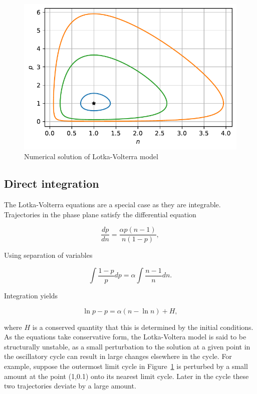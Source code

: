 \documentclass[
  letterpaper,
  DIV=11,
  numbers=noendperiod]{scrreprt}
\begin{document}
\begin{figure}

{\centering \includegraphics{ContinuousTimeTwoSepcies_files/figure-pdf/fig-lv-numsol-phplane-output-1.pdf}

}

\caption{\label{fig-lv-numsol-phplane}Numerical solution of
Lotka-Volterra model}

\end{figure}

\hypertarget{direct-integration}{%
\subsection{Direct integration}\label{direct-integration}}

The Lotka-Volterra equations are a special case as they are integrable.
Trajectories in the phase plane satisfy the differential equation

\[
\frac{dp }{d n} = \frac{\alpha p (n-1)}{n(1-p)},
\]

Using separation of variables

\[
\int \frac{1-p}{p} dp  = \alpha  \int \frac{n-1}{n} dn.  
\]

Integration yields

\[
\ln p - p =  \alpha (n-\ln n) + H,
\]

where \(H\) is a conserved quantity that this is determined by the
initial conditions. As the equations take conservative form, the
Lotka-Voltera model is said to be structurally unstable, as a small
perturbation to the solution at a given point in the oscillatory cycle
can result in large changes elsewhere in the cycle. For example, suppose
the outermost limit cycle in Figure~\ref{fig-lv-numsol-phplane} is
perturbed by a small amount at the point (1,0.1) onto its nearest limit
cycle. Later in the cycle these two trajectories deviate by a large
amount.
\end{document}

